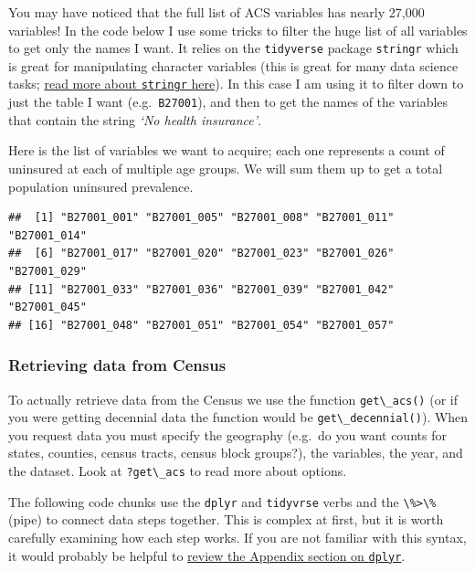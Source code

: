 \documentclass[
]{book}
\newcommand{\passthrough}[1]{#1}
\begin{document}
You may have noticed that the full list of ACS variables has nearly 27,000 variables! In the code below I use some tricks to filter the huge list of all variables to get only the names I want. It relies on the \passthrough{\lstinline!tidyverse!} package \passthrough{\lstinline!stringr!} which is great for manipulating character variables (this is great for many data science tasks; \href{https://stringr.tidyverse.org/}{read more about \passthrough{\lstinline!stringr!} here}). In this case I am using it to filter down to just the table I want (e.g.~\passthrough{\lstinline!B27001!}), and then to get the names of the variables that contain the string \emph{`No health insurance'}.

Here is the list of variables we want to acquire; each one represents a count of uninsured at each of multiple age groups. We will sum them up to get a total population uninsured prevalence.

\begin{lstlisting}
##  [1] "B27001_001" "B27001_005" "B27001_008" "B27001_011" "B27001_014"
##  [6] "B27001_017" "B27001_020" "B27001_023" "B27001_026" "B27001_029"
## [11] "B27001_033" "B27001_036" "B27001_039" "B27001_042" "B27001_045"
## [16] "B27001_048" "B27001_051" "B27001_054" "B27001_057"
\end{lstlisting}

\hypertarget{retrieving-data-from-census}{%
\subsubsection{Retrieving data from Census}\label{retrieving-data-from-census}}

To actually retrieve data from the Census we use the function \passthrough{\lstinline!get\_acs()!} (or if you were getting decennial data the function would be \passthrough{\lstinline!get\_decennial()!}). When you request data you must specify the geography (e.g.~do you want counts for states, counties, census tracts, census block groups?), the variables, the year, and the dataset. Look at \passthrough{\lstinline!?get\_acs!} to read more about options.

The following code chunks use the \passthrough{\lstinline!dplyr!} and \passthrough{\lstinline!tidyvrse!} verbs and the \passthrough{\lstinline!\%>\%!} (pipe) to connect data steps together. This is complex at first, but it is worth carefully examining how each step works. If you are not familiar with this syntax, it would probably be helpful to \protect\hyperlink{dplyr}{review the Appendix section on \passthrough{\lstinline!dplyr!}}.
\end{document}
